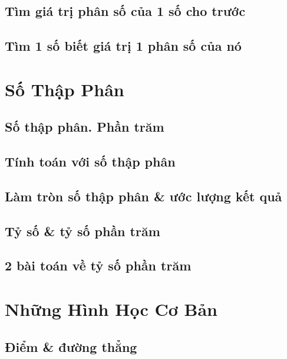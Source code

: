 \documentclass{article}
\numberwithin{equation}{section}
\begin{document}
\subsection{Tìm giá trị phân số của 1 số cho trước}

\subsection{Tìm 1 số biết giá trị 1 phân số của nó}


\section{Số Thập Phân}

\subsection{Số thập phân. Phần trăm}

\subsection{Tính toán với số thập phân}

\subsection{Làm tròn số thập phân \& ước lượng kết quả}

\subsection{Tỷ số \& tỷ số phần trăm}

\subsection{2 bài toán về tỷ số phần trăm}


\section{Những Hình Học Cơ Bản}

\subsection{Điểm \& đường thẳng}
\end{document}
